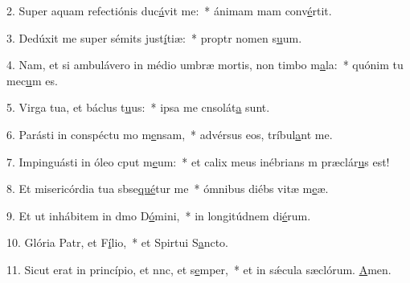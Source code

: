 2. Super aquam refectiónis duc\uline{á}vit me:~* ánimam mam conv\uline{é}rtit.\par 
3. Dedúxit me super sémits just\uline{í}tiæ:~* proptr nomen s\uline{u}um.\par 
4. Nam, et si ambulávero in médio umbræ mortis, non timbo m\uline{a}la:~* quónim tu mec\uline{u}m es.\par 
5. Virga tua, et báclus t\uline{u}us:~* ipsa me cnsolát\uline{a} sunt.\par 
6. Parásti in conspéctu mo m\uline{e}nsam,~* advérsus eos,  tríbul\uline{a}nt me.\par 
7. Impinguásti in óleo cput m\uline{e}um:~* et calix meus inébrians m præclár\uline{u}s est!\par 
8. Et misericórdia tua sbse\uline{qué}tur me~* ómnibus diébs vitæ m\uline{e}æ.\par 
9. Et ut inhábitem in dmo D\uline{ó}mini,~* in longitúdnem di\uline{é}rum.\par 
10. Glória Patr, et F\uline{í}lio,~* et Spirtui S\uline{a}ncto.\par 
11. Sicut erat in princípio, et nnc, et s\uline{e}mper,~* et in sǽcula sæclórum. \uline{A}men.\par 
